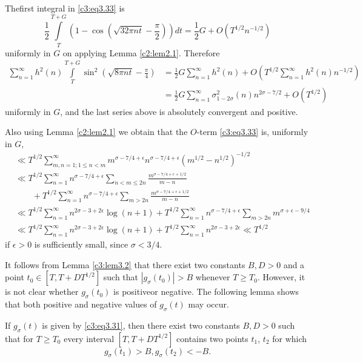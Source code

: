 The\pageoriginale first integral in \eqref{c3:eq3.33} is 
$$
\frac{1}{2} \int\limits_T^{T+G} \left(1- \cos \left(\sqrt{32 \pi nt} -
\frac{\pi}{2} \right)\right) dt = \frac{1}{2} G + O \left(T^{1/2}
n^{-1/2} \right)
$$
uniformly in $G$ on applying Lemma \ref{c2:lem2.1}. Therefore
{\fontsize{10}{12}\selectfont
\begin{align*}
  \sum_{n=1}^{\infty} h^2 (n) \int\limits_T^{T+G} \sin^2 \left(\sqrt{8
  \pi n t}- \frac{\pi}{4} \right) & = \frac{1}{2} G \sum_{n=1}^\infty
  h^2 (n) + O \left(T^{1/2} \sum_{n=1}^\infty h^2 (n) n^{-1/2}\right)
  \\
  & = \frac{1}{2} G \sum_{n=1}^{\infty} \sigma_{1-2 \sigma}^2 (n) n^{2
  \sigma - 7/2}+ O(T^{1/2})
\end{align*}}
uniformly in $G$, and the last series above is absolutely convergent
and positive.

Also using Lemma \ref{c2:lem2.1} we obtain that the $O$-term
\eqref{c3:eq3.33} is, uniformly in $G$,
\begin{align*}
  & \ll T^{1/2} \sum_{m, n=1; 1 \leq n < m}^\infty m^{\sigma-7/4 +
    \epsilon}n^{\sigma- 7/4+ \epsilon} (m^{1/2}- n^{1/2})^{-1/2}\\
  & \ll T^{1/2} \sum_{n=1}^\infty n^{\sigma- 7/4+ \epsilon} \sum_{n <
    m \leq 2n} \frac{m^{\sigma- 7/4 +\epsilon + 1/2}}{m-n} \\
  & \qquad + T^{1/2} \sum_{n=1}^\infty n^{\sigma- 7/4+ \epsilon} \sum_{m >
    2n} \frac{m^{\sigma-7/4 + \epsilon + 1/2}}{m-n}\\
  & \ll T^{1/2} \sum_{n=1}^\infty n^{2 \sigma - 3 + 2 \epsilon} \log (n+1)
  + T^{1/2} \sum_{n=1}^\infty n^{\sigma- 7/4+ \epsilon} \sum_{m> 2n}
  m^{\sigma+ \epsilon - 9/4}\\
  & \ll T^{1/2} \sum_{n=1}^\infty n^{2 \sigma - 3 + 2 \epsilon} \log (n+1)
  + T^{1/2} \sum_{n=1}^\infty n^{2\sigma - 3 + 2 \epsilon}\ll T^{1/2}
\end{align*}
if $\epsilon > 0$ is sufficiently small, since $\sigma < 3/4$.

It follows from Lemma \ref{c3:lem3.2} that there exist two constants
$B, D> 0$ and a point $t_0 \in [T, T+ DT^{1/2}]$ such that $|g_\sigma
(t_0)|> B$ whenever $T\geq T_0$. However, it is not clear whether
$g_\sigma (t_0)$ is positive\pageoriginale or negative. The following
lemma shows that both positive and negative values of $g_\sigma (t)$
may occur.

\begin{lemma}\label{c3:lem3.4}
  If $g_\sigma (t)$ is given by \eqref{c3:eq3.31}, then there exist two constants
 $B,D > 0$ such that for $ T\geq T_0$ every interval $[T,T +
    DT^{1/2}]$ contains two points $ t_1$, $t_2$ for which 
  \begin{equation}
    g_\sigma (t_1) > B, g_\sigma(t_2) < -B.\label{c3:eq3.34}
  \end{equation}
\end{lemma}

